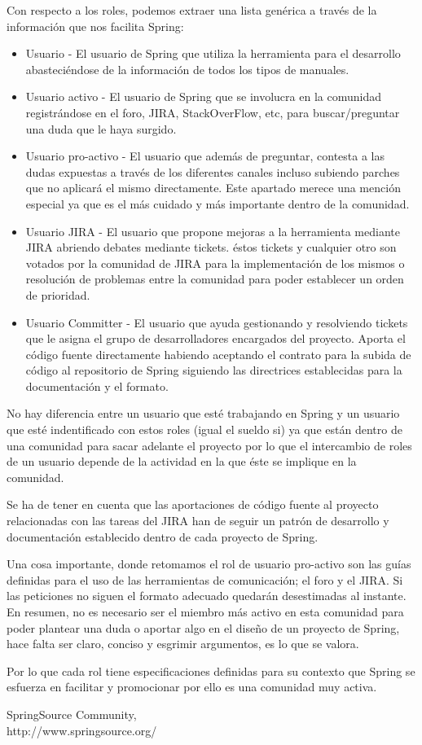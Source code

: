 \documentclass[11pt]{scrartcl}
\begin{document}
Con respecto a los roles, podemos extraer una lista gen\'erica a trav\'es de la informaci\'on que nos facilita Spring:

\begin{itemize}
    \item Usuario - El usuario de Spring que utiliza la herramienta para el desarrollo abasteci\'endose de la informaci\'on de todos los tipos de manuales.
    \item Usuario activo - El usuario de Spring que se involucra en la comunidad registr\'andose en el foro, JIRA, StackOverFlow, etc, para buscar/preguntar una duda que le haya surgido.
    \item Usuario pro-activo - El usuario que adem\'as de preguntar, contesta a las dudas expuestas a trav\'es de los diferentes canales incluso subiendo parches que no aplicar\'a el mismo directamente. Este apartado merece una menci\'on especial ya que es el m\'as cuidado y m\'as importante dentro de la comunidad.
    \item Usuario JIRA - El usuario que propone mejoras a la herramienta mediante JIRA abriendo debates mediante tickets. \'estos tickets y cualquier otro son votados por la comunidad de JIRA para la implementaci\'on de los mismos o resoluci\'on de problemas entre la comunidad para poder establecer un orden de prioridad.
    \item Usuario Committer - El usuario que ayuda gestionando y resolviendo tickets que le asigna el grupo de desarrolladores encargados del proyecto. Aporta el c\'odigo fuente directamente habiendo aceptando el contrato para la subida de c\'odigo al repositorio de Spring siguiendo las directrices establecidas para la documentaci\'on y el formato.
\end{itemize}

No hay diferencia entre un usuario que est\'e trabajando en Spring y un usuario que est\'e indentificado con estos roles (igual el sueldo si) ya que est\'an dentro de una comunidad para sacar adelante el proyecto por lo que el intercambio de roles de un usuario depende de la actividad en la que \'este se implique en la comunidad.

Se ha de tener en cuenta que las aportaciones de c\'odigo fuente al proyecto relacionadas con las tareas del JIRA han de seguir un patr\'on de desarrollo y documentaci\'on establecido dentro de cada proyecto de Spring.

Una cosa importante, donde retomamos el rol de usuario pro-activo son las gu\'ias definidas para el uso de las herramientas de comunicaci\'on; el foro y el JIRA. Si las peticiones no siguen el formato adecuado quedar\'an desestimadas al instante. En resumen, no es necesario ser el miembro m\'as activo en esta comunidad para poder plantear una duda o aportar algo en el dise\~no de un proyecto de Spring, hace falta ser claro, conciso y esgrimir argumentos, es lo que se valora.

Por lo que cada rol tiene especificaciones definidas para su contexto que Spring se esfuerza en facilitar y promocionar por ello es una comunidad muy activa.

\begin{thebibliography}{9}

  SpringSource Community,\\
  http://www.springsource.org/

\end{thebibliography}
\end{document}
